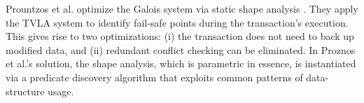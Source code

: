 Prountzos et al. \cite{PrountzosMPM11} optimize the Galois system \cite{Galois} via static shape analysis \cite{MoolyToplas}. They apply the TVLA system to identify fail-safe points during the transaction's execution. This gives rise to two optimizations: (i) the transaction does not need to back up modified data, and (ii) redundant conflict checking can be eliminated. In Proznos et al.'s solution, the shape analysis, which is parametric in essence, is instantiated via a predicate discovery algorithm that exploits common patterns of data-structure usage.



